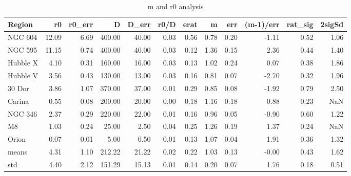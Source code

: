 \begin{table}
\centering
\caption{m and r0 analysis}
\begin{tabular}{lrrrrrrrrrrr}
\toprule
   Region &     r0 &  r0_err &       D &  D_err &  r0/D &  erat &     m &   err &  (m-1)/err &  rat_sig &  2sigSd  \\
\midrule
  NGC 604 &  12.09 &    6.69 &  400.00 &  40.00 &  0.03 &  0.56 &  0.78 &  0.20 &      -1.11 &     0.52 &     1.06 \\
  NGC 595 &  11.15 &    0.74 &  400.00 &  40.00 &  0.03 &  0.12 &  1.36 &  0.15 &       2.36 &     0.44 &     1.40 \\
 Hubble X &   4.10 &    0.31 &  160.00 &  16.00 &  0.03 &  0.13 &  1.02 &  0.24 &       0.07 &     0.38 &     1.86 \\
 Hubble V &   3.56 &    0.43 &  130.00 &  13.00 &  0.03 &  0.16 &  0.81 &  0.07 &      -2.70 &     0.32 &     1.96 \\
   30 Dor &   3.86 &    1.07 &  370.00 &  37.00 &  0.01 &  0.29 &  0.85 &  0.08 &      -1.92 &     0.79 &     2.50 \\
   Carina &   0.55 &    0.08 &  200.00 &  20.00 &  0.00 &  0.18 &  1.16 &  0.18 &       0.88 &     0.23 &      NaN \\
  NGC 346 &   2.37 &    0.29 &  220.00 &  22.00 &  0.01 &  0.16 &  0.96 &  0.05 &      -0.90 &     0.60 &     1.22 \\
       M8 &   1.03 &    0.24 &   25.00 &   2.50 &  0.04 &  0.25 &  1.26 &  0.19 &       1.37 &     0.24 &      NaN \\
    Orion &   0.07 &    0.01 &    5.00 &   0.50 &  0.01 &  0.13 &  1.07 &  0.04 &       1.91 &     0.36 &     1.32 \\
    means &   4.31 &    1.10 &  212.22 &  21.22 &  0.02 &  0.22 &  1.03 &  0.13 &      -0.00 &     0.43 &     1.62 \\
      std &   4.40 &    2.12 &  151.29 &  15.13 &  0.01 &  0.14 &  0.20 &  0.07 &       1.76 &     0.18 &     0.51 \\
\bottomrule
\end{tabular}
\end{table}

